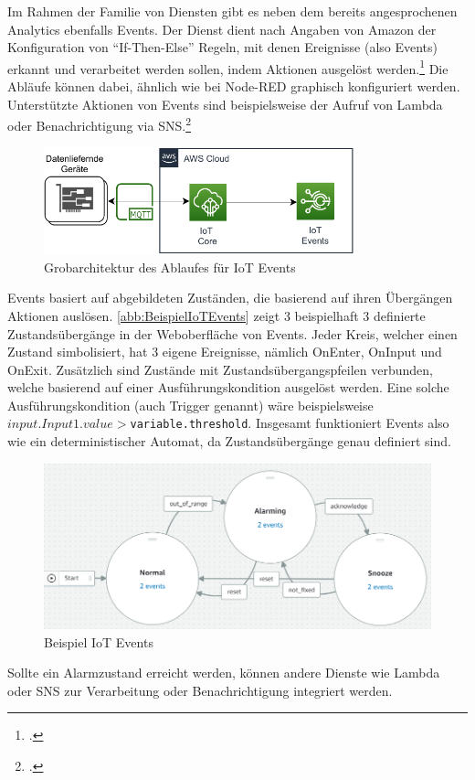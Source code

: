 Im Rahmen der \AWSIOT{} Familie von Diensten gibt es neben dem bereits angesprochenen \AWSIOT{} Analytics ebenfalls \AWSIOT{} Events.  
Der Dienst dient nach Angaben von Amazon der Konfiguration von \enquote{If-Then-Else} Regeln, mit denen Ereignisse (also Events) erkannt und verarbeitet werden sollen, indem Aktionen ausgelöst werden.\footcite[Vgl.][]{AmazonWebServicesInc..o.J.b} Die Abläufe können dabei, ähnlich wie bei Node-RED graphisch konfiguriert werden. Unterstützte Aktionen von \AWSIOT{} Events sind beispielsweise der Aufruf von Lambda oder Benachrichtigung via \ac{SNS}.\footcite[Vgl.][]{AmazonWebServicesInc..o.J.ao}
\begin{figure}[H]
\centering
\includegraphics[width=0.8\textwidth]{graphics/IoT-Events-general.pdf}
\caption{Grobarchitektur des Ablaufes für IoT Events}
\label{abb:GrobArchitekturIoTEvents}
\end{figure}

\AWSIOT{} Events basiert auf abgebildeten Zuständen, die basierend auf ihren Übergängen Aktionen auslösen. \autoref{abb:BeispielIoTEvents} zeigt 3 beispielhaft 3 definierte Zustandsübergänge in der Weboberfläche von \AWSIOT{} Events. Jeder Kreis, welcher einen Zustand simbolisiert, hat 3 eigene Ereignisse, nämlich OnEnter, OnInput und OnExit. Zusätzlich sind Zustände mit Zustandsübergangspfeilen verbunden, welche basierend auf einer Ausführungskondition ausgelöst werden. Eine solche Ausführungskondition (auch Trigger genannt) wäre beispielsweise \texttt{$input.Input1.value > $variable.threshold}. Insgesamt funktioniert \AWSIOT{} Events also wie ein deterministischer Automat, da Zustandsübergänge genau definiert sind.
\begin{figure}[H]
\centering
\includegraphics[width=\textwidth]{graphics/IoT-Events-Demo.png}
\caption{Beispiel IoT Events}
\label{abb:BeispielIoTEvents}
\end{figure}
Sollte ein Alarmzustand erreicht werden, können andere Dienste wie Lambda oder \ac{SNS} zur Verarbeitung oder Benachrichtigung integriert werden.

